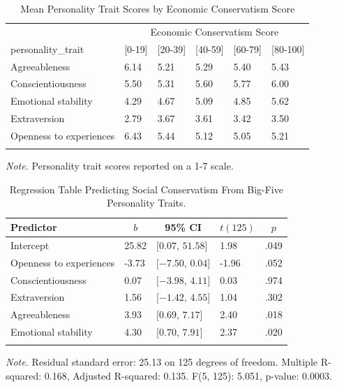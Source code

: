\documentclass[man]{apa6}
\begin{document}
\begin{table}[tbp]
\begin{center}
\begin{threeparttable}
\caption{\label{tab:table2}Mean Personality Trait Scores by Economic Conservatism Score}
\begin{tabular}{llllll}
\toprule
 & \multicolumn{5}{c}{Economic Conservatism Score} \\
\cmidrule(r){2-6}
personality\_trait & \multicolumn{1}{c}{[0-19]} & \multicolumn{1}{c}{[20-39]} & \multicolumn{1}{c}{[40-59]} & \multicolumn{1}{c}{[60-79]} & \multicolumn{1}{c}{[80-100]}\\
\midrule
Agreeableness & 6.14 & 5.21 & 5.29 & 5.40 & 5.43\\
Conscientiousness & 5.50 & 5.31 & 5.60 & 5.77 & 6.00\\
Emotional stability & 4.29 & 4.67 & 5.09 & 4.85 & 5.62\\
Extraversion & 2.79 & 3.67 & 3.61 & 3.42 & 3.50\\
Openness to experiences & 6.43 & 5.44 & 5.12 & 5.05 & 5.21\\
\bottomrule
\addlinespace
\end{tabular}
\begin{tablenotes}[para]
\normalsize{\textit{Note.} Personality trait scores reported on a 1-7 scale.}
\end{tablenotes}
\end{threeparttable}
\end{center}
\end{table}

\begin{table}[tbp]
\begin{center}
\begin{threeparttable}
\caption{\label{tab:table3}Regression Table Predicting Social Conservatism From Big-Five Personality Traits.}
\begin{tabular}{lllll}
\toprule
Predictor & \multicolumn{1}{c}{$b$} & \multicolumn{1}{c}{95\% CI} & \multicolumn{1}{c}{$t(125)$} & \multicolumn{1}{c}{$p$}\\
\midrule
Intercept & 25.82 & $[0.07$, $51.58]$ & 1.98 & .049\\
Openness to experiences & -3.73 & $[-7.50$, $0.04]$ & -1.96 & .052\\
Conscientiousness & 0.07 & $[-3.98$, $4.11]$ & 0.03 & .974\\
Extraversion & 1.56 & $[-1.42$, $4.55]$ & 1.04 & .302\\
Agreeableness & 3.93 & $[0.69$, $7.17]$ & 2.40 & .018\\
Emotional stability & 4.30 & $[0.70$, $7.91]$ & 2.37 & .020\\
\bottomrule
\addlinespace
\end{tabular}
\begin{tablenotes}[para]
\normalsize{\textit{Note.} Residual standard error: 25.13 on 125 degrees of freedom.
Multiple R-squared: 0.168, Adjusted R-squared: 0.135. F(5, 125): 5.051, p-value: 0.0003.}
\end{tablenotes}
\end{threeparttable}
\end{center}
\end{table}
\end{document}
